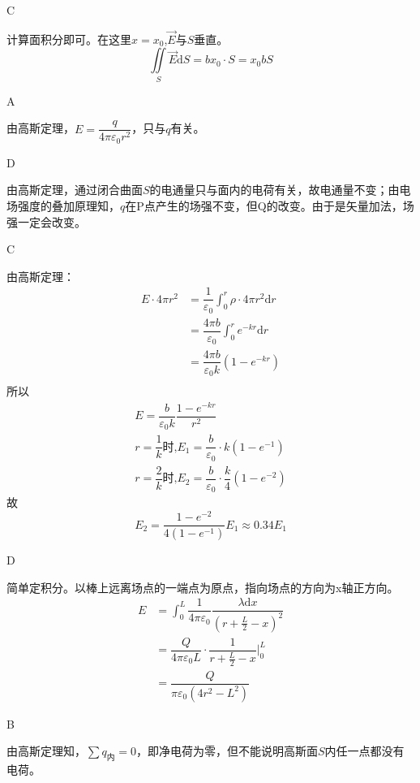 \documentclass[b5paper,opensource,sourcefont,parskip]{qyxf-book}
\newcommand{\di}[1]{\mathrm{d}#1}
\begin{document}
C

\solve
计算面积分即可。在这里$x=x_0$,$\vec{E}$与$S$垂直。
\begin{equation*}
	 \iint\limits_S \vec{E}\di{S}=bx_0\cdot S=x_0bS
\end{equation*}

A

\solve
由高斯定理，$E=\dfrac{q}{4\pi\varepsilon_0 r^2}$，只与$q$有关。

D

\solve
由高斯定理，通过闭合曲面$S$的电通量只与面内的电荷有关，故电通量不变；由电场强度的叠加原理知，$q$在P点产生的场强不变，但Q的改变。由于是矢量加法，场强一定会改变。

C

\solve
由高斯定理：
\begin{align*}
	E\cdot 4\pi r^2&=\dfrac{1}{\varepsilon_0}\int_0^r\rho\cdot 4\pi r^2\di{r}\\
	&=\dfrac{4\pi b}{\varepsilon_0}\int_0^r e^{-kr}\di{r}\\
	&=\dfrac{4\pi b}{\varepsilon_0 k}(1-e^{-kr})\\
\end{align*}
所以
\begin{gather*}
	E=\dfrac{b}{\varepsilon_0 k}\dfrac{1-e^{-kr}}{r^2}\\
	r=\dfrac{1}{k}\textbf{时,}E_1=\dfrac{b}{\varepsilon_0}\cdot k(1-e^{-1})\\
	r=\dfrac{2}{k}\textbf{时,}E_2=\dfrac{b}{\varepsilon_0}\cdot \dfrac{k}{4}(1-e^{-2})
\end{gather*}
故
\begin{equation*}
	E_2=\dfrac{1-e^{-2}}{4(1-e^{-1})}E_1\approx 0.34E_1
\end{equation*}

D

\solve
简单定积分。以棒上远离场点的一端点为原点，指向场点的方向为x轴正方向。
\begin{align*}
	E&=\int_{0}^{L}\dfrac{1}{4\pi \varepsilon_0}\dfrac{\lambda\di{x}}{{(r+\frac{L}{2}-x)}^2}\\
	&=\dfrac{Q}{4\pi \varepsilon_0 L}\cdot \dfrac{1}{{r+\frac{L}{2}-x}}\bigg|_0^L\\
	&=\dfrac{Q}{\pi \varepsilon_0(4r^2-L^2)}
\end{align*}

B

\solve
由高斯定理知，$\sum q_{\text{内}}=0$，即净电荷为零，但不能说明高斯面$S$内任一点都没有电荷。
\end{document}
